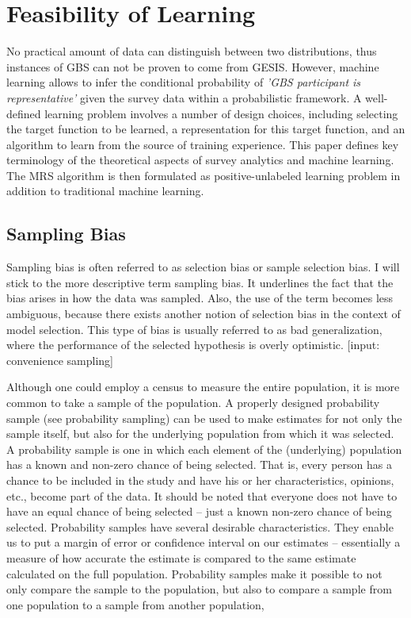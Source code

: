 \chapter{Feasibility of Learning}\label{Sec:Feasibility of Learning}

No practical amount of data can distinguish between two distributions, thus instances of GBS can not be proven to come from GESIS. However, machine learning allows to infer the conditional probability of \textit{'GBS participant is representative'} given the survey data within a probabilistic framework. A well-defined learning problem involves a number of design choices, including selecting the target function to be learned, a representation for this target function, and an algorithm to learn from the source of training experience. This paper defines key terminology of the theoretical aspects of survey analytics and machine learning. The MRS algorithm is then formulated as positive-unlabeled learning problem in addition to traditional machine learning.

\section{Sampling Bias}

Sampling bias is often referred to as selection bias or sample selection bias. I will stick to the more descriptive term sampling bias. It underlines the fact that the bias arises in how the data was sampled. Also, the use of the term becomes less ambiguous, because there exists another notion of selection bias in the context of model selection. This type of bias is usually referred to as bad generalization, where the performance of the selected hypothesis is overly optimistic. [input: convenience sampling]

Although one could employ a census to measure the entire population, it is more common to take a sample of the population. A properly designed probability sample (see probability sampling) can be used to make estimates for not only the sample itself, but also for the underlying population from which it was selected. A probability sample is one in which each element of the (underlying) population has a known and non-zero chance of being selected. That is, every person has a chance to be included in the study and have his or her characteristics, opinions, etc., become part of the data. It should be noted that everyone does not have to have an equal chance of being selected – just a known non-zero chance of being selected. 
Probability samples have several desirable characteristics. They enable us to put a margin of error or confidence interval on our estimates – essentially a measure of how accurate the estimate is compared to the same estimate calculated on the full population. Probability samples make it possible to not only compare the sample to the population, but also to compare a sample from one population to a sample from another population,


